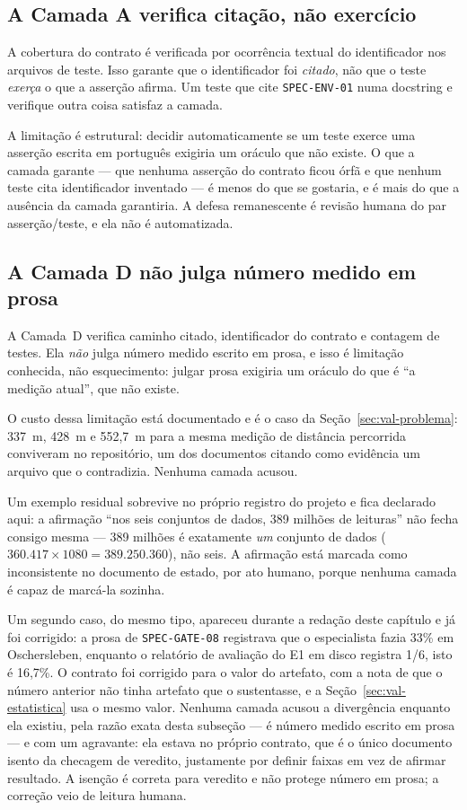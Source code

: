 \subsection{A Camada A verifica citação, não exercício}

A cobertura do contrato é verificada por ocorrência textual do identificador nos
arquivos de teste. Isso garante que o identificador foi \textit{citado}, não que
o teste \textit{exerça} o que a asserção afirma. Um teste que cite
\texttt{SPEC-ENV-01} numa docstring e verifique outra coisa satisfaz a camada.

A limitação é estrutural: decidir automaticamente se um teste exerce uma asserção
escrita em português exigiria um oráculo que não existe. O que a camada garante
--- que nenhuma asserção do contrato ficou órfã e que nenhum teste cita
identificador inventado --- é menos do que se gostaria, e é mais do que a
ausência da camada garantiria. A defesa remanescente é revisão humana do par
asserção/teste, e ela não é automatizada.

\subsection{A Camada D não julga número medido em prosa}

A Camada~D verifica caminho citado, identificador do contrato e contagem de
testes. Ela \textit{não} julga número medido escrito em prosa, e isso é limitação
conhecida, não esquecimento: julgar prosa exigiria um oráculo do que é ``a
medição atual'', que não existe.

O custo dessa limitação está documentado e é o caso da
Seção~\ref{sec:val-problema}: 337~m, 428~m e 552,7~m para a mesma medição de
distância percorrida conviveram no repositório, um dos documentos citando como evidência um
arquivo que o contradizia. Nenhuma camada acusou.

Um exemplo residual sobrevive no próprio registro do projeto e fica declarado
aqui: a afirmação ``nos seis conjuntos de dados, 389 milhões de leituras'' não
fecha consigo mesma --- 389 milhões é exatamente \textit{um} conjunto de dados
($360.417 \times 1080 = 389.250.360$), não seis. A afirmação está marcada como
inconsistente no documento de estado, por ato humano, porque nenhuma camada é
capaz de marcá-la sozinha.

Um segundo caso, do mesmo tipo, apareceu durante a redação deste capítulo e já
foi corrigido: a prosa de \texttt{SPEC-GATE-08} registrava que o especialista
fazia 33\% em Oschersleben, enquanto o relatório de avaliação do E1 em disco
registra 1/6, isto é 16,7\%. O contrato foi corrigido para o valor do artefato,
com a nota de que o número anterior não tinha artefato que o sustentasse, e a
Seção~\ref{sec:val-estatistica} usa o mesmo valor. Nenhuma camada acusou a
divergência enquanto ela existiu, pela razão exata desta subseção --- é número
medido escrito em prosa --- e com um agravante: ela estava no próprio contrato,
que é o único documento isento da checagem de veredito, justamente por definir
faixas em vez de afirmar resultado. A isenção é correta para veredito e não
protege número em prosa; a correção veio de leitura humana.

